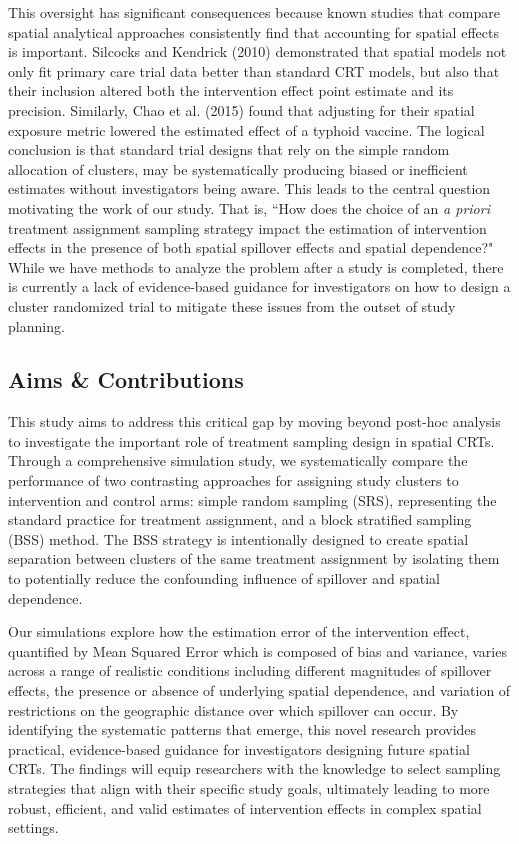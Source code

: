 \documentclass{article}[11pt]
\begin{document}
This oversight has significant consequences because known studies that compare spatial analytical approaches consistently find that accounting for spatial effects is important. Silcocks and Kendrick (2010) demonstrated that spatial models not only fit primary care trial data better than standard CRT models, but also that their inclusion altered both the intervention effect point estimate and its precision\cite{silcocks_spatial_2010}. Similarly, Chao et al. (2015) found that adjusting for their spatial exposure metric lowered the estimated effect of a typhoid vaccine\cite{chao_contribution_2015}. The logical conclusion is that standard trial designs that rely on the simple random allocation of clusters, may be systematically producing biased or inefficient estimates without investigators being aware. This leads to the central question motivating the work of our study. That is, ``How does the choice of an \textit{a priori} treatment assignment sampling strategy impact the estimation of intervention effects in the presence of both spatial spillover effects and spatial dependence?" While we have methods to analyze the problem after a study is completed, there is currently a lack of evidence-based guidance for investigators on how to design a cluster randomized trial to mitigate these issues from the outset of study planning.

\subsection{Aims \& Contributions}

This study aims to address this critical gap by moving beyond post-hoc analysis to investigate the important role of treatment sampling design in spatial CRTs. Through a comprehensive simulation study, we systematically compare the performance of two contrasting approaches for assigning study clusters to intervention and control arms: simple random sampling (SRS), representing the standard practice for treatment assignment, and a block stratified sampling (BSS) method. The BSS strategy is intentionally designed to create spatial separation between clusters of the same treatment assignment by isolating them to potentially reduce the confounding influence of spillover and spatial dependence.

Our simulations explore how the estimation error of the intervention effect, quantified by Mean Squared Error which is composed of bias and variance, varies across a range of realistic conditions including different magnitudes of spillover effects, the presence or absence of underlying spatial dependence, and variation of restrictions on the geographic distance over which spillover can occur. By identifying the systematic patterns that emerge, this novel research provides practical, evidence-based guidance for investigators designing future spatial CRTs. The findings will equip researchers with the knowledge to select sampling strategies that align with their specific study goals, ultimately leading to more robust, efficient, and valid estimates of intervention effects in complex spatial settings.
\end{document}
